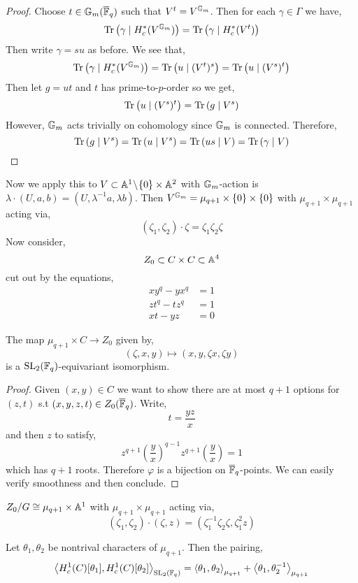 \documentclass[12pt]{article}
\begin{document}
\begin{proof}
Choose $t \in {\mathbb{G}_m}(\overline{\mathbb{F}}_q)$ such that $V^t = V^{\mathbb{G}_m}$. Then for each $\gamma \in \Gamma$ we have,
\[ \mathrm{Tr}\left( \gamma \mid H^*_c(V^{\mathbb{G}_m}) \right) = \mathrm{Tr}\left( \gamma \mid H^*_c(V^t) \right) \]
Then write $\gamma = su$ as before. We see that,
\[ \mathrm{Tr}\left( \gamma \mid H^*_c(V^{\mathbb{G}_m}) \right) = \mathrm{Tr}\left( u \mid (V^t)^s \right) = \mathrm{Tr}\left( u \mid (V^s)^t \right) \]
Then let $g = ut$ and $t$ has prime-to-$p$-order so we get,
\[  \mathrm{Tr}\left( u \mid (V^s)^t \right) = \mathrm{Tr}\left( g \mid V^s \right) \]
However, ${\mathbb{G}_m}$ acts trivially on cohomology since ${\mathbb{G}_m}$ is connected. Therefore, 
\[ \mathrm{Tr}\left( g \mid V^s \right) = \mathrm{Tr}\left( u \mid V^s \right) = \mathrm{Tr}\left( us \mid V \right) = \mathrm{Tr}\left( \gamma \mid V \right) \]
\end{proof}

Now we apply this to $V \subset \mathbb{A}^1 \! \setminus \! \{ 0 \} \times \mathbb{A}^2$ with ${\mathbb{G}_m}$-action is $\lambda \cdot (U, a, b) = (U, \lambda^{-1} a, \lambda b)$. Then $V^{\mathbb{G}_m} = \mu_{q+1} \times \{ 0 \} \times \{ 0 \}$ with $\mu_{q+1} \times \mu_{q+1}$ acting via,
\[ (\zeta_1, \zeta_2) \cdot \zeta = \zeta_1 \zeta_2 \zeta \]
Now consider,
\[ Z_0 \subset C \times C \subset \mathbb{A}^4 \]
cut out by the equations,
\begin{align*}
x y^q - y x^q  & = 1
\\
z t^q - t z^q & = 1
\\
x t - y z & = 0
\end{align*}

\begin{lemma}
The map $\mu_{q+1} \times C \to Z_0$ given by,
\[ (\zeta, x, y) \mapsto (x, y, \zeta x, \zeta y) \]
is a $\mathrm{SL}_2(\mathbb{F}_q)$-equivariant isomorphism. 
\end{lemma}

\begin{proof}
Given $(x,y) \in C$ we want to show there are at most $q+1$ options for $(z,t)$ s.t $(x,y,z,t) \in Z_0(\overline{\mathbb{F}}_q)$. Write,
\[ t = \frac{y z}{x} \]
and then $z$ to satisfy,
\[ z^{q+1} \left( \frac{y}{x} \right)^{q - 1} z^{q+1} \left( \frac{y}{x} \right) = 1 \]
which has $q+1$ roots. Therefore $\varphi$ is a bijection on $\overline{\mathbb{F}}_q$-points. We can easily verify smoothness and then conclude. 
\end{proof}

\begin{cor}
$Z_0 / G \cong \mu_{q+1} \times \mathbb{A}^1$ with $\mu_{q+1} \times \mu_{q+1}$ acting via,
\[ (\zeta_1, \zeta_2) \cdot (\zeta, z) = (\zeta_1^{-1} \zeta_2 \zeta, \zeta_1^2 z) \]
\end{cor}

\begin{theorem}[Mackey]
Let $\theta_1, \theta_2$ be nontrival characters of $\mu_{q+1}$. Then the pairing,
\[ \left< H^1_c(C)[\theta_1], H^1_c(C)[\theta_2] \right>_{\mathrm{SL}_2(\mathbb{F}_q)} = \left< \theta_1, \theta_2 \right>_{\mu_{q+1}} + \left< \theta_1, \theta_2^{-1} \right>_{\mu_{q+1}} \]
\end{theorem}
\end{document}
